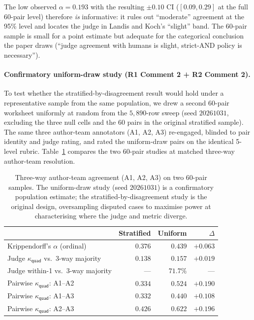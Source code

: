 The low observed $\alpha = 0.193$ with the resulting $\pm 0.10$ CI ($[0.09, 0.29]$ at the full 60-pair level) therefore \emph{is} informative: it rules out ``moderate'' agreement at the 95\% level and locates the judge in Landis and Koch's ``slight'' band. The 60-pair sample is small for a point estimate but adequate for the categorical conclusion the paper draws (``judge agreement with humans is slight, strict-AND policy is necessary'').

\paragraph{Confirmatory uniform-draw study (R1 Comment 2 + R2 Comment 2).}
To test whether the stratified-by-disagreement result would hold under a representative sample from the same population, we drew a second 60-pair worksheet uniformly at random from the $5{,}890$-row sweep (seed $20261031$, excluding the three null cells and the 60 pairs in the original stratified sample). The same three author-team annotators (A1, A2, A3) re-engaged, blinded to pair identity and judge rating, and rated the uniform-draw pairs on the identical 5-level rubric. Table~\ref{tab:human_eval_uniform_vs_stratified} compares the two 60-pair studies at matched three-way author-team resolution.

\begin{table}[!htbp]
  \centering
  \caption{Three-way author-team agreement (A1, A2, A3) on two 60-pair
    samples. The uniform-draw study (seed $20261031$) is a confirmatory
    population estimate; the stratified-by-disagreement study is the
    original design, oversampling disputed cases to maximise power at
    characterising where the judge and metric diverge.}
  \label{tab:human_eval_uniform_vs_stratified}
  \begin{tabular}{lrrr}
    \toprule
     & Stratified & Uniform & $\Delta$ \\
    \midrule
    Krippendorff's $\alpha$ (ordinal)         & $0.376$ & $0.439$ & $+0.063$ \\
    Judge $\kappa_{\textsf{quad}}$ vs.\ 3-way majority & $0.138$ & $0.157$ & $+0.019$ \\
    Judge within-1 vs.\ 3-way majority        & ---     & $71.7\%$ & --- \\
    \midrule
    Pairwise $\kappa_{\textsf{quad}}$: A1--A2 & $0.334$ & $0.524$ & $+0.190$ \\
    Pairwise $\kappa_{\textsf{quad}}$: A1--A3 & $0.332$ & $0.440$ & $+0.108$ \\
    Pairwise $\kappa_{\textsf{quad}}$: A2--A3 & $0.426$ & $0.622$ & $+0.196$ \\
    \bottomrule
  \end{tabular}
\end{table}

